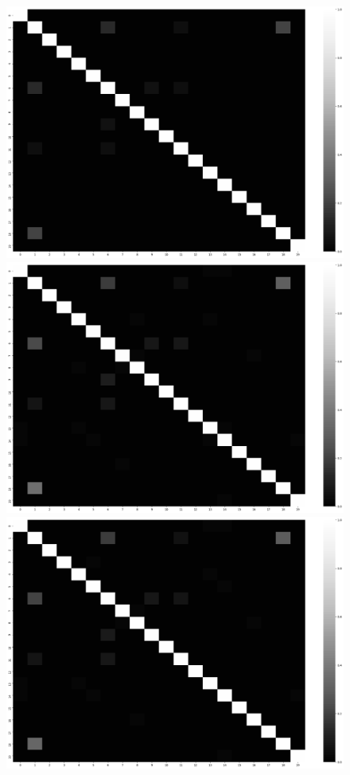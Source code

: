 \begin{figure}[htbp]
	\includegraphics[width=\linewidth / 2]{figures/experiments/syn/20ng/20ng_relationship_graph.png}
	\includegraphics[width=\linewidth / 2]{figures/experiments/syn/20ng/JC_relationship_graph.png}
	\includegraphics[width=\linewidth / 2]{figures/experiments/syn/20ng/JC_BIG_relationship_graph.png}

\end{figure}
